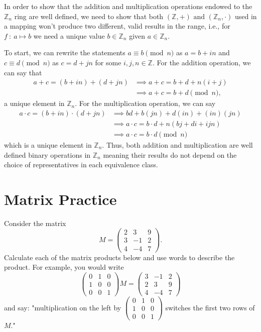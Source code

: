 \documentclass[12pt]{article}
\newenvironment{answer}
    {\begin{adjustwidth}{0pt}{0pt}}
    {\end{adjustwidth}}
\theoremstyle{remark}  %
\begin{document}
    \begin{answer}
        In order to show that the addition and multiplication operations endowed to the $\mathbb{Z}_n$ ring are well defined, we need to show that both $(\mathbb{Z},+)\text{ and }(\mathbb{Z}_n,\cdot)$ used in a mapping won't produce two different, valid results in the range, i.e., for $f\ :\ a\mapsto b$ we need a unique value $b\in\mathbb{Z}_n$ given $a\in\mathbb{Z}_n$. \par To start, we can rewrite the statements $a\equiv b\pmod{n}$ as $a=b+in$ and $c\equiv d\pmod{n}$ as $c=d+jn$ for some $i,j,n\in\mathbb{Z}$. For the addition operation, we can say that 
        \begin{align*}
            a + c = (b + in) + (d +jn) &\implies a+c = b+d + n(i+j) \\
            &\implies a+c=b+d\pmod{n},
        \end{align*}
        a unique element in $\mathbb{Z}_n$. For the multiplication operation, we can say 
        \begin{align*}    
        a\cdot c = (b + in)\cdot(d+jn) &\implies bd + b(jn) + d(in) + (in)(jn) \\
        &\implies a \cdot c = b\cdot d + n(bj+di+ijn) \\
        &\implies a \cdot c = b \cdot d \pmod{n}
        \end{align*}
        which is a unique element in $\mathbb{Z}_n$. Thus, both addition and multiplication are well defined binary operations in $\mathbb{Z}_n$ meaning their results do not depend on the choice of representatives in each equivalence class.
    \end{answer}

\section*{Matrix Practice}
Consider the matrix \[
    M = \begin{pmatrix}
        2 & 3 & 9 \\
        3 & -1 & 2 \\
        4 & -4 & 7
    \end{pmatrix}.
\]
Calculate each of the matrix products below and use words to describe the product. For example, you would write \[
    \begin{pmatrix}
        0 & 1 & 0 \\
        1 & 0 & 0 \\
        0 & 0 & 1
    \end{pmatrix}
    M = \begin{pmatrix}
        3 & -1 & 2 \\
        2 & 3 & 9 \\
        4 & -4 & 7
    \end{pmatrix}
\] and say: "multiplication on the left by $\begin{pmatrix}
    0 & 1 & 0 \\
    1 & 0 & 0 \\
    0 & 0 & 1
\end{pmatrix}$ switches the first two rows of $M$."
\end{document}
